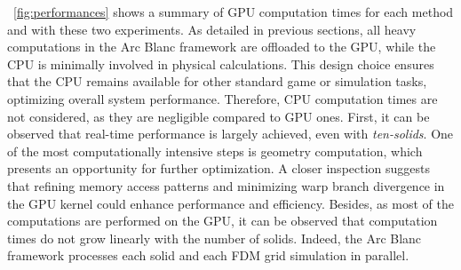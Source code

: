 \documentclass[11pt]{article}
\def\framework{the Arc Blanc framework\xspace}
\begin{document}
\tablename~\ref{fig:performances} shows a summary of GPU computation times for each method and with these two experiments.
As detailed in previous sections, all heavy computations in \framework are offloaded to the GPU, while the CPU is minimally involved in physical calculations. This design choice ensures that the CPU remains available for other standard game or simulation tasks, optimizing overall system performance. Therefore, CPU computation times are not considered, as they are negligible compared to GPU ones.
First, it can be observed that real-time performance is largely achieved, even with \emph{ten-solids}. One of the most computationally intensive steps is geometry computation, which presents an opportunity for further optimization. A closer inspection suggests that refining memory access patterns and minimizing warp branch divergence in the GPU kernel could enhance performance and efficiency.
Besides, as most of the computations are performed on the GPU, it can be observed that computation times do not grow linearly with the number of solids.
Indeed, \framework processes each solid and each FDM grid simulation in parallel.
\end{document}
